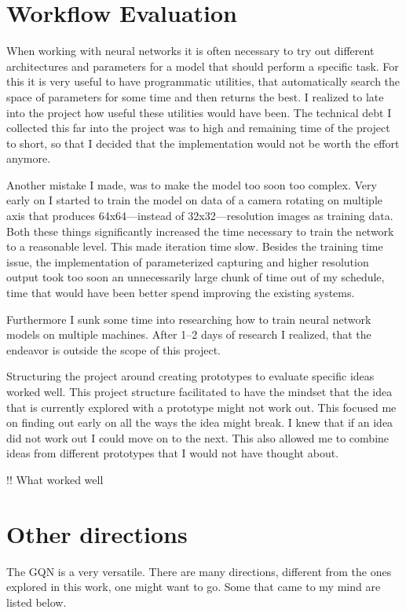 \section{Workflow Evaluation}
When working with neural networks it is often necessary to try out different architectures and parameters for a model that should perform a specific task. For this it is very useful to have programmatic utilities, that automatically search the space of parameters for some time and then returns the best. I realized to late into the project how useful these utilities would have been. The technical debt I collected this far into the project was to high and remaining time of the project to short, so that I decided that the implementation would not be worth the effort anymore.

Another mistake I made, was to make the model too soon too complex. Very early on I started to train the model on data of a camera rotating on multiple axis that produces 64x64---instead of 32x32---resolution images as training data. Both these things significantly increased the time necessary to train the network to a reasonable level. This made iteration time slow. Besides the training time issue, the implementation of parameterized capturing and higher resolution output took too soon an unnecessarily large chunk of time out of my schedule, time that would have been better spend improving the existing systems.

Furthermore I sunk some time into researching how to train neural network models on multiple machines. After 1--2 days of research I realized, that the endeavor is outside the scope of this project.

Structuring the project around creating prototypes to evaluate specific ideas worked well. This project structure facilitated to have the mindset that the idea that is currently explored with a prototype might not work out. This focused me on finding out early on all the ways the idea might break. I knew that if an idea did not work out I could move on to the next. This also allowed me to combine ideas from different prototypes that I would not have thought about.

!! What worked well

\section{Other directions}
The GQN is a very versatile. There are many directions, different from the ones explored in this work, one might want to go. Some that came to my mind are listed below.

